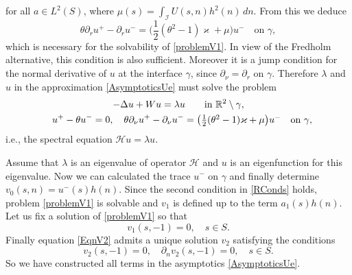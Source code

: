 \documentclass[reqno]{amsart}
\theoremstyle{plain}
\numberwithin{equation}{section}
\renewcommand{\kappa}{\varkappa}
\newcommand{\Real}{\mathbb R}
\newcommand{\cI}{\mathcal{I}}
\newcommand{\cH}{\mathcal{H}}
\begin{document}
for all  $a\in L^2(S)$, where $\mu(s)=\int_{\cI} U(s,n)h^2(n)\, dn$.
From this we deduce
\begin{equation*}
  \theta\partial_r u^+-\partial_r u^-
=\big(\textstyle\frac{1}{2}(\theta^2-1)\kappa+\mu \big) u^-\quad\text {on }\gamma,
\end{equation*}
which is necessary for the solvability of \eqref{problemV1}.
In view of the Fredholm alternative, this condition is also  sufficient. Moreover it is a jump condition for the normal derivative of $u$   at the interface $\gamma$, since $\partial_\nu=\partial_r$ on $\gamma$.
Therefore  $\lambda$ and $u$ in the approximation \eqref{AsymptoticsUe} must solve the problem
\begin{gather}\label{LimitProblemEq}
-\Delta u+Wu=\lambda u \qquad \hbox{in  } \Real^2\setminus \gamma,
\\ \label{RConds}
 \phantom{-}u^+-\theta u^-=0,  \quad
\theta\partial_\nu u^+-\partial_\nu u^-
=\big(\textstyle\frac{1}{2}(\theta^2-1)\kappa+\mu \big) u^- \quad \hbox{on } \gamma,
\end{gather}
i.e., the spectral equation $\cH u=\lambda u$.

Assume that $\lambda$ is an eigenvalue of operator $\cH$ and $u$  is an eigenfunction for this eigenvalue.
Now we can calculated the trace $u^-$ on $\gamma$ and  finally determine $v_0(s,n)=u^-(s)h(n)$.
Since the second condition in \eqref{RConds} holds,
problem \eqref{problemV1} is solvable and $v_1$ is defined up to the term $a_1(s) h(n)$.
Let us fix  a solution of \eqref{problemV1} so that
\begin{equation}\label{V1At-1}
  v_1(s,-1)=0, \quad s\in S.
\end{equation}
Finally equation \eqref{EqnV2} admits a unique solution $v_2$ satisfying  the conditions
\begin{equation}\label{V2At-1}
  v_2(s, -1)=0, \quad \partial_n v_2(s, -1)=0, \quad s\in S.
\end{equation}
So we have constructed all terms in the asymptotics \eqref{AsymptoticsUe}.
\end{document}
